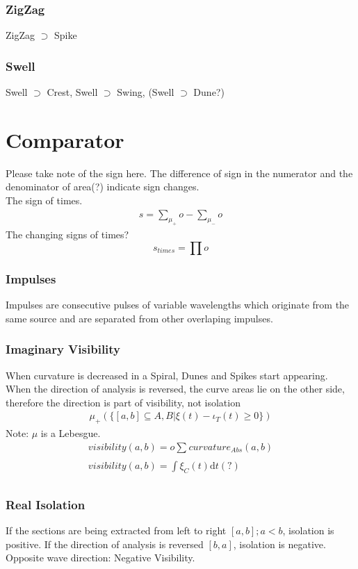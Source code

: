 \documentclass{report}
\begin{document}
\subsection{ZigZag}
ZigZag $\supset$ Spike
\subsection{Swell}
Swell $\supset$ Crest, Swell $\supset$ Swing, (Swell $\supset$ Dune?)

\chapter{Comparator}
Please take note of the sign here. The difference of sign in the numerator and the denominator of area(?) indicate sign changes.\\
The sign of times.
\begin{align}
s = \sum_{\mu_{+}}^{}o -  \sum_{\mu_{-}}^{}o
\end{align}
The changing signs of times?
\begin{equation}
s_{times} = \prod o
\end{equation}

\subsection{Impulses}
Impulses are consecutive pulses of variable wavelengths which originate from the same source and are separated from other overlaping impulses.

\subsection{Imaginary Visibility}
When curvature is decreased in a Spiral, Dunes and Spikes start appearing.\\
When the direction of analysis is reversed, the curve areas lie on the other side, therefore the direction is part of visibility, not isolation
\begin{align}
\mu_{+}(\{[a,b] \subseteq A,B \vert \xi(t) -\iota_{T}(t)\geq0\})
\end{align}
Note: $\mu$ is a Lebesgue.
\begin{align}
visibility(a,b)=o \sum_{}^{} curvature_{Abs}(a,b)\\
visibility(a,b)= \int \limits _{}^{}\xi_{C}(t)\mathrm{d}t(?)
\end{align}

\subsection{Real Isolation}
If the sections are being extracted from left to right $[a,b];a<b$, isolation is positive. If the direction of analysis is reversed $[b,a]$, isolation is negative.\\
Opposite wave direction: Negative Visibility.
\end{document}
